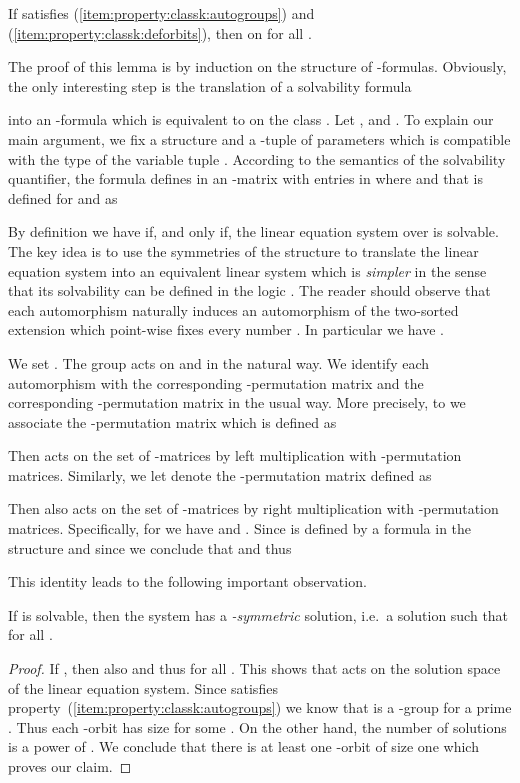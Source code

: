 \documentclass[a4paper,UKenglish]{lipics}
\theoremstyle{plain}
\begin{document}
\begin{lemma}
\label{lemma:fps:fpc:prop12}
 If  satisfies (\ref{item:property:classk:autogroups}) and
 (\ref{item:property:classk:deforbits}), then  on  
for all .
\end{lemma}

The proof of this lemma is by induction on the structure of 
-formulas. 
Obviously, 
the only interesting step is the translation of a solvability formula

into an -formula  which is equivalent to 
 on the class .
Let ,  
and 
. To explain our main argument, we fix a structure  and a -tuple of parameters  which 
is compatible with the type of the variable tuple . 
According to the semantics of the solvability quantifier, the formula 
 defines in 
 an -matrix  with 
entries in  where  
and  that is defined for  and  as


By definition we have  if, and only if, the linear 
equation system  over  is solvable.
The key idea is to use the symmetries of the structure  to translate 
the linear equation system  into 
an equivalent linear system which is \emph{simpler} in the sense that its
solvability can be defined in the logic .
The reader should observe that each automorphism  naturally 
induces an automorphism of the two-sorted extension  which 
point-wise fixes every number . In particular we 
have .

\medskip
We set . 
The group  acts on  and  in the natural way. We identify 
each automorphism  with the corresponding -permutation matrix  and the corresponding -permutation 
matrix  in the usual way. More precisely, to  
we associate the -permutation matrix  which is defined as

Then  acts on the set of -matrices by left
multiplication with -permutation matrices. Similarly, we let
 denote the -permutation matrix defined as 

Then  also acts on the set of -matrices by right
multiplication with -permutation matrices. Specifically, for
 we have  and . Since  is defined by a formula in the structure  and 
since  we conclude that  and thus

This identity leads to the following important observation.

\begin{lemma}\label{lemma:fps:symmetric:solution}
 If  is solvable, then 
the system has a \emph{-symmetric} solution, i.e.\ a solution  such that  for all .
\end{lemma}
\begin{proof}
If , then also  and thus  for all 
. This shows that  acts on the solution space of the 
linear equation system. 
Since  satisfies property~(\ref{item:property:classk:autogroups}) we know 
that  is a -group for a prime . Thus each -orbit 
has size  for some . On the other hand, the number of 
solutions is a power of . We conclude that there is at least one 
-orbit of size one which proves our claim.
\end{proof}
\end{document}

